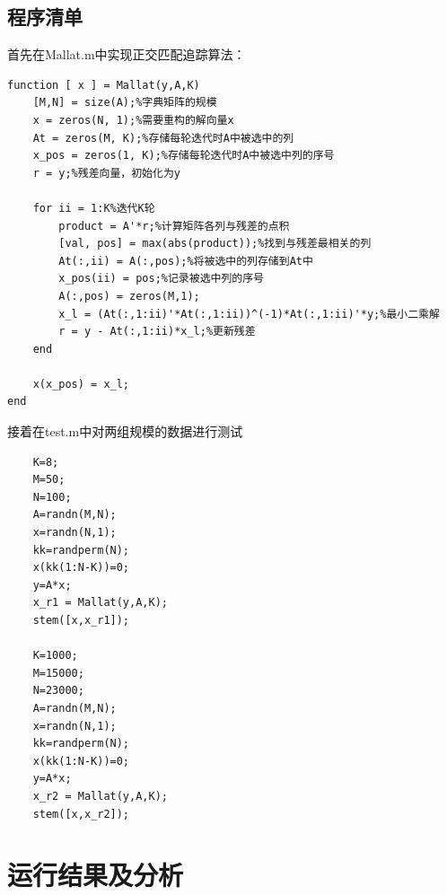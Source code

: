 \documentclass{article}
\begin{document}
\subsection{程序清单}
首先在Mallat.m中实现正交匹配追踪算法：
\begin{lstlisting}
function [ x ] = Mallat(y,A,K)
	[M,N] = size(A);%字典矩阵的规模
	x = zeros(N, 1);%需要重构的解向量x
	At = zeros(M, K);%存储每轮迭代时A中被选中的列
	x_pos = zeros(1, K);%存储每轮迭代时A中被选中列的序号
	r = y;%残差向量，初始化为y
	
	for ii = 1:K%迭代K轮
		product = A'*r;%计算矩阵各列与残差的点积
		[val, pos] = max(abs(product));%找到与残差最相关的列
		At(:,ii) = A(:,pos);%将被选中的列存储到At中
		x_pos(ii) = pos;%记录被选中列的序号
		A(:,pos) = zeros(M,1);
		x_l = (At(:,1:ii)'*At(:,1:ii))^(-1)*At(:,1:ii)'*y;%最小二乘解
		r = y - At(:,1:ii)*x_l;%更新残差
	end
	
	x(x_pos) = x_l;
end
\end{lstlisting}
接着在test.m中对两组规模的数据进行测试
\begin{lstlisting}
	K=8;
	M=50;
	N=100;
	A=randn(M,N);
	x=randn(N,1);
	kk=randperm(N);
	x(kk(1:N-K))=0;
	y=A*x;
	x_r1 = Mallat(y,A,K);
	stem([x,x_r1]);
	
	K=1000;
	M=15000;
	N=23000;
	A=randn(M,N);
	x=randn(N,1);
	kk=randperm(N);
	x(kk(1:N-K))=0;
	y=A*x;
	x_r2 = Mallat(y,A,K);
	stem([x,x_r2]);
\end{lstlisting}

\section{运行结果及分析}
\end{document}
